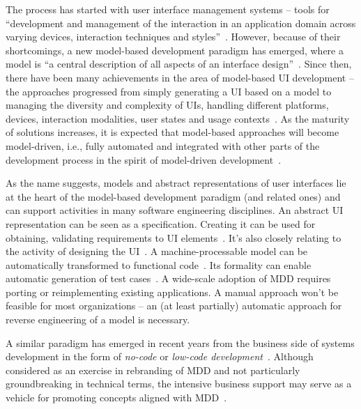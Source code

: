 The process has started with user interface management systems – tools for \enquote{development and management of the interaction in an application domain across varying devices, interaction techniques and styles}~\cite{Betts1987}.
However, because of their shortcomings, a new model-based development paradigm has emerged, where a model is \enquote{a central description of all aspects of an interface design}~\cite{Puerta1994}.
Since then, there have been many achievements in the area of model-based UI development – the approaches progressed from simply generating a UI based on a model to managing the diversity and complexity of UIs, handling different platforms, devices, interaction modalities, user states and usage contexts~\cite{Meixner2011}.
As the maturity of solutions increases, it is expected that model-based approaches will become model-driven, i.e., fully automated and integrated with other parts of the development process in the spirit of model-driven development~\cite{Ruiz2018}.

As the name suggests, models and abstract representations of user interfaces lie at the heart of the model-based development paradigm (and related ones) and can support activities in many software engineering disciplines.
An abstract UI representation can be seen as a specification.
Creating it can be used for obtaining, validating requirements to UI elements~\cite{Homrighausen2002}.
It’s also closely relating to the activity of designing the UI~\cite{Feuerstack2006}.
A machine-processable model can be automatically transformed to functional code~\cite{Fu2011, MonteMor2011}.
Its formality can enable automatic generation of test cases~\cite{Vieira2006}.
A wide-scale adoption of MDD requires porting or reimplementing existing applications.
A manual approach won’t be feasible for most organizations – an (at least partially) automatic approach for reverse engineering of a model is necessary.

A similar paradigm has emerged in recent years from the business side of systems development in the form of \emph{no-code} or \emph{low-code development}~\cite{Rymer2019}.
Although considered as an exercise in rebranding of MDD and not particularly groundbreaking in technical terms, the intensive business support may serve as a vehicle for promoting concepts aligned with MDD~\cite{Bock2021}.

